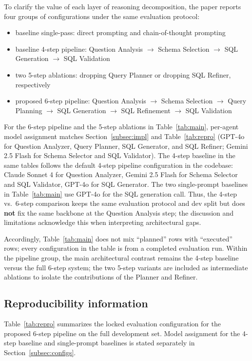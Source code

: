 To clarify the value of each layer of reasoning decomposition, the paper reports four groups of configurations under the same evaluation protocol:
\begin{itemize}
  \item baseline single-pass: direct prompting and chain-of-thought prompting
  \item baseline 4-step pipeline: Question Analysis $\rightarrow$ Schema Selection $\rightarrow$ SQL Generation $\rightarrow$ SQL Validation
  \item two 5-step ablations: dropping Query Planner or dropping SQL Refiner, respectively
  \item proposed 6-step pipeline: Question Analysis $\rightarrow$ Schema Selection $\rightarrow$ Query Planning $\rightarrow$ SQL Generation $\rightarrow$ SQL Refinement $\rightarrow$ SQL Validation
\end{itemize}

For the 6-step pipeline and the 5-step ablations in Table~\ref{tab:main}, per-agent model assignment matches Section~\ref{subsec:impl} and Table~\ref{tab:repro} (GPT-4o for Question Analyzer, Query Planner, SQL Generator, and SQL Refiner; Gemini 2.5 Flash for Schema Selector and SQL Validator). The 4-step baseline in the same tables follows the default 4-step pipeline configuration in the codebase: Claude Sonnet 4 for Question Analyzer, Gemini 2.5 Flash for Schema Selector and SQL Validator, GPT-4o for SQL Generator. The two single-prompt baselines in Table~\ref{tab:main} use GPT-4o for the SQL generation call. Thus, the 4-step vs.\ 6-step comparison keeps the same evaluation protocol and dev split but does \textbf{not} fix the same backbone at the Question Analysis step; the discussion and limitations acknowledge this when interpreting architectural gaps.

Accordingly, Table~\ref{tab:main} does not mix ``planned'' rows with ``executed'' rows; every configuration in the table is from a completed evaluation run. Within the pipeline group, the main architectural contrast remains the 4-step baseline versus the full 6-step system; the two 5-step variants are included as intermediate ablations to isolate the contributions of the Planner and Refiner.

\subsection{Reproducibility information}\label{subsec:repro}

Table~\ref{tab:repro} summarizes the locked evaluation configuration for the proposed 6-step pipeline on the full development set. Model assignment for the 4-step baseline and single-prompt baselines is stated separately in Section~\ref{subsec:configs}.

